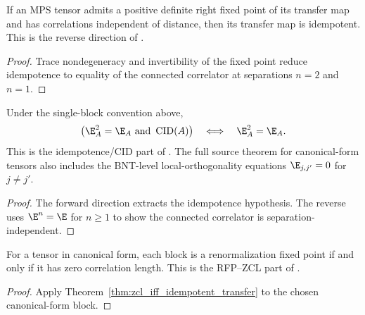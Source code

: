 \begin{theorem}\label{thm:isCID_implies_isRFP}
    \leanok
    If an MPS tensor admits a positive definite right fixed point of its
    transfer map and has correlations independent of distance, then
    its transfer map is idempotent.
    This is the reverse direction of \cite[Theorem~3.8]{Cirac2016MPDO_arXiv}.
\end{theorem}
\begin{proof}\leanok
    Trace nondegeneracy and invertibility of the fixed point reduce
    idempotence to equality of the connected correlator at separations
    $n=2$ and $n=1$.
\end{proof}

\begin{theorem}%
    \label{thm:zcl_iff_idempotent_transfer}
    \leanok
    Under the single-block convention above,
    \[
        \bigl(\E_A^2=\E_A \ \text{and}\ \operatorname{CID}(A)\bigr)
        \quad\Longleftrightarrow\quad
        \E_A^2=\E_A .
    \]
    This is the idempotence/CID part of
    \cite[Theorem~3.8]{Cirac2016MPDO_arXiv}. The full source theorem for
    canonical-form tensors also includes the BNT-level local-orthogonality
    equations $\E_{j,j'}=0$ for $j\ne j'$.
\end{theorem}
\begin{proof}\leanok
    The forward direction extracts the idempotence hypothesis. The reverse uses
    $\E^n = \E$ for $n \ge 1$ to show the connected correlator is
    separation-independent.
\end{proof}

\begin{theorem}%
    \label{thm:rfp_iff_zcl}
    \leanok
    For a tensor in canonical form, each block is a renormalization fixed point
    if and only if it has zero correlation length.
    This is the RFP--ZCL part of \cite[Theorem~3.10]{Cirac2016MPDO_arXiv}.
\end{theorem}
\begin{proof}\leanok
    Apply Theorem~\ref{thm:zcl_iff_idempotent_transfer} to the chosen
    canonical-form block.
\end{proof}
